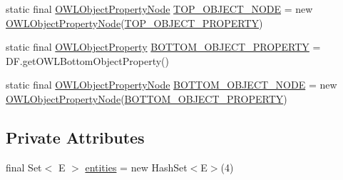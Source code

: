 \begin{DoxyCompactItemize}
\item 
static final \hyperlink{classorg_1_1semanticweb_1_1owlapi_1_1reasoner_1_1impl_1_1_o_w_l_object_property_node}{O\-W\-L\-Object\-Property\-Node} \hyperlink{classorg_1_1semanticweb_1_1owlapi_1_1reasoner_1_1impl_1_1_default_node_3_01_e_01extends_01_o_w_l_object_01_4_acde9f704b259f1da720e24281bb94266}{T\-O\-P\-\_\-\-O\-B\-J\-E\-C\-T\-\_\-\-N\-O\-D\-E} = new \hyperlink{classorg_1_1semanticweb_1_1owlapi_1_1reasoner_1_1impl_1_1_o_w_l_object_property_node}{O\-W\-L\-Object\-Property\-Node}(\hyperlink{classorg_1_1semanticweb_1_1owlapi_1_1reasoner_1_1impl_1_1_default_node_3_01_e_01extends_01_o_w_l_object_01_4_a5a1e5e8eddd7be03848e28c8d41e5431}{T\-O\-P\-\_\-\-O\-B\-J\-E\-C\-T\-\_\-\-P\-R\-O\-P\-E\-R\-T\-Y})
\item 
static final \hyperlink{interfaceorg_1_1semanticweb_1_1owlapi_1_1model_1_1_o_w_l_object_property}{O\-W\-L\-Object\-Property} \hyperlink{classorg_1_1semanticweb_1_1owlapi_1_1reasoner_1_1impl_1_1_default_node_3_01_e_01extends_01_o_w_l_object_01_4_a1371cb8251a9654234c4ad34c4255701}{B\-O\-T\-T\-O\-M\-\_\-\-O\-B\-J\-E\-C\-T\-\_\-\-P\-R\-O\-P\-E\-R\-T\-Y} = D\-F.\-get\-O\-W\-L\-Bottom\-Object\-Property()
\item 
static final \hyperlink{classorg_1_1semanticweb_1_1owlapi_1_1reasoner_1_1impl_1_1_o_w_l_object_property_node}{O\-W\-L\-Object\-Property\-Node} \hyperlink{classorg_1_1semanticweb_1_1owlapi_1_1reasoner_1_1impl_1_1_default_node_3_01_e_01extends_01_o_w_l_object_01_4_a7dd394eb6d446d4b4ac4411c56bfcdf2}{B\-O\-T\-T\-O\-M\-\_\-\-O\-B\-J\-E\-C\-T\-\_\-\-N\-O\-D\-E} = new \hyperlink{classorg_1_1semanticweb_1_1owlapi_1_1reasoner_1_1impl_1_1_o_w_l_object_property_node}{O\-W\-L\-Object\-Property\-Node}(\hyperlink{classorg_1_1semanticweb_1_1owlapi_1_1reasoner_1_1impl_1_1_default_node_3_01_e_01extends_01_o_w_l_object_01_4_a1371cb8251a9654234c4ad34c4255701}{B\-O\-T\-T\-O\-M\-\_\-\-O\-B\-J\-E\-C\-T\-\_\-\-P\-R\-O\-P\-E\-R\-T\-Y})
\end{DoxyCompactItemize}
\subsection*{Private Attributes}
\begin{DoxyCompactItemize}
\item 
final Set$<$ E $>$ \hyperlink{classorg_1_1semanticweb_1_1owlapi_1_1reasoner_1_1impl_1_1_default_node_3_01_e_01extends_01_o_w_l_object_01_4_af2826bc43289498118f9522a2f2a140c}{entities} = new Hash\-Set$<$E$>$(4)
\end{DoxyCompactItemize}
